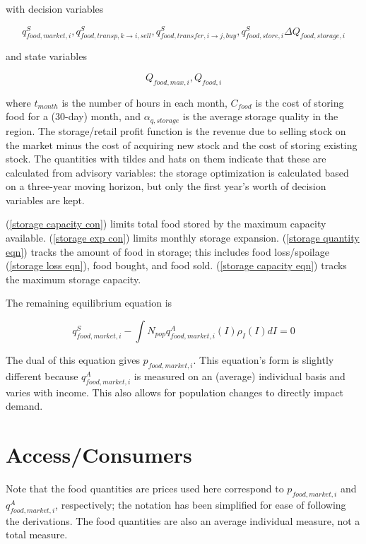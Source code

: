 \documentclass[letter,12pt]{article}
\begin{document}
\noindent with decision variables

\begin{equation}
q_{food,market,i}^S, q_{food,transp,k \rightarrow i,sell}^S, q_{food,transfer,i \rightarrow j,buy}^S, q_{food,store,i}^S \Delta Q_{food,storage,i} 
\end{equation}

\noindent and state variables

\begin{equation}
Q_{food,max,i}, Q_{food,i}
\end{equation}

\noindent where $t_{month}$ is the number of hours in each month, $C_{food}$ is the cost of storing food for a (30-day) month, and $\alpha_{q,storage}$ is the average storage quality in the region.  The storage/retail profit function is the revenue due to selling stock on the market minus the cost of acquiring new stock and the cost of storing existing stock.  The quantities with tildes and hats on them indicate that these are calculated from advisory variables: the storage optimization is calculated based on a three-year moving horizon, but only the first year's worth of decision variables are kept.

(\ref{storage capacity con}) limits total food stored by the maximum capacity available.  (\ref{storage exp con}) limits monthly storage expansion.  (\ref{storage quantity eqn}) tracks the amount of food in storage; this includes food loss/spoilage (\ref{storage loss eqn}), food bought, and food sold.  (\ref{storage capacity eqn}) tracks the maximum storage capacity.

The remaining equilibrium equation is

\begin{equation}
q_{food,market,i}^S - \int N_{pop} q_{food,market,i}^A \left(I\right) \rho_I \left(I\right) dI = 0
\end{equation}

The dual of this equation gives $p_{food,market,i}$.  This equation's form is slightly different because $q_{food,market,i}^A$ is measured on an (average) individual basis and varies with income.  This also allows for population changes to directly impact demand.

\section{Access/Consumers}

Note that the food quantities are prices used here correspond to $p_{food,market,i}$ and $q_{food,market,i}^A$, respectively; the notation has been simplified for ease of following the derivations.  The food quantities are also an average individual measure, not a total measure.
\end{document}
